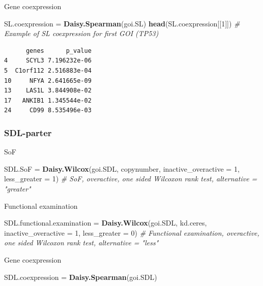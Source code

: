 \documentclass[]{article}
\newenvironment{Shaded}{\begin{snugshade}}{\end{snugshade}}
\newcommand{\KeywordTok}[1]{\textcolor[rgb]{0.13,0.29,0.53}{\textbf{#1}}}
\newcommand{\DataTypeTok}[1]{\textcolor[rgb]{0.13,0.29,0.53}{#1}}
\newcommand{\DecValTok}[1]{\textcolor[rgb]{0.00,0.00,0.81}{#1}}
\newcommand{\StringTok}[1]{\textcolor[rgb]{0.31,0.60,0.02}{#1}}
\newcommand{\CommentTok}[1]{\textcolor[rgb]{0.56,0.35,0.01}{\textit{#1}}}
\newcommand{\NormalTok}[1]{#1}
\begin{document}
Gene coexpression

\begin{Shaded}
\begin{Highlighting}[]
\NormalTok{SL.coexpression =}\StringTok{ }\KeywordTok{Daisy.Spearman}\NormalTok{(goi.SL)}
\KeywordTok{head}\NormalTok{(SL.coexpression[[}\DecValTok{1}\NormalTok{]]) }\CommentTok{# Example of SL coexpression for first GOI (TP53)}
\end{Highlighting}
\end{Shaded}

\begin{verbatim}
      genes      p_value
4     SCYL3 7.196232e-06
5  C1orf112 2.516883e-04
10     NFYA 2.641665e-09
13    LAS1L 3.844908e-02
17   ANKIB1 1.345544e-02
24     CD99 8.535496e-03
\end{verbatim}

\subsubsection{SDL-parter}\label{sdl-parter}

SoF

\begin{Shaded}
\begin{Highlighting}[]
\NormalTok{SDL.SoF =}\StringTok{ }\KeywordTok{Daisy.Wilcox}\NormalTok{(goi.SDL, copynumber, }\DataTypeTok{inactive_overactive =} \DecValTok{1}\NormalTok{, }\DataTypeTok{less_greater =} \DecValTok{1}\NormalTok{) }\CommentTok{# SoF, overactive, one sided Wilcoxon rank test, alternative = "greater"}
\end{Highlighting}
\end{Shaded}

Functional examination

\begin{Shaded}
\begin{Highlighting}[]
\NormalTok{SDL.functional.examination =}\StringTok{ }\KeywordTok{Daisy.Wilcox}\NormalTok{(goi.SDL, kd.ceres, }\DataTypeTok{inactive_overactive =} \DecValTok{1}\NormalTok{, }\DataTypeTok{less_greater =} \DecValTok{0}\NormalTok{) }\CommentTok{# Functional examination, overactive, one sided Wilcoxon rank test, alternative = "less"}
\end{Highlighting}
\end{Shaded}

Gene coexpression

\begin{Shaded}
\begin{Highlighting}[]
\NormalTok{SDL.coexpression =}\StringTok{ }\KeywordTok{Daisy.Spearman}\NormalTok{(goi.SDL)}
\end{Highlighting}
\end{Shaded}
\end{document}
